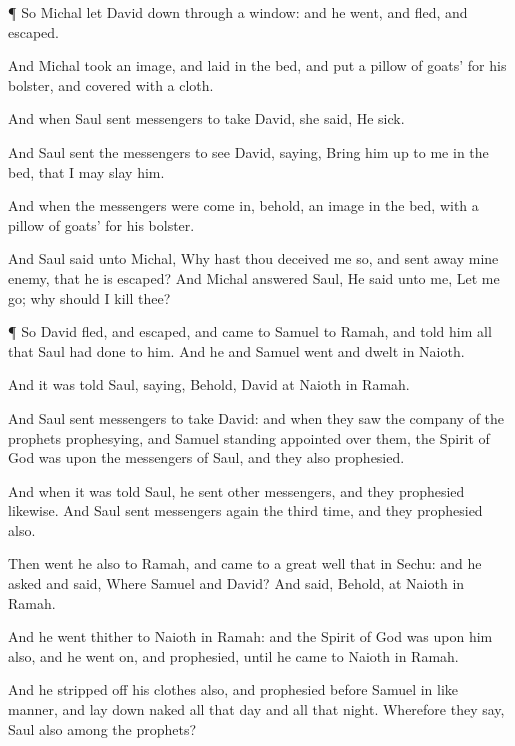 {\par }{\PP {}¶ So
Michal
let
David
down through a
window: and he
went, and
fled, and
escaped.

And
Michal
took an
image, and
laid
{} in the
bed, and
put a
pillow of
goats’
{} for his
bolster, and
covered
{} with a
cloth.

And when
Saul
sent
messengers to
take
David, she
said, He
{}
sick.

And
Saul
sent the
messengers
{} to
see
David,
saying, Bring him
up to me in the
bed, that I may
slay him.

And when the
messengers were come
in, behold,
{} an
image in the
bed, with a
pillow of
goats’
{} for his
bolster.

And
Saul
said unto
Michal, Why hast thou deceived me
so, and sent
away mine
enemy, that he is
escaped? And
Michal
answered
Saul, He
said unto me, Let me
go; why should I
kill thee?


\par }{\PP {}¶ So
David
fled, and
escaped, and
came to
Samuel to
Ramah, and
told him all that
Saul had
done to him. And he and
Samuel
went and
dwelt in
Naioth.

And it was
told
Saul,
saying, Behold,
David
{} at
Naioth in
Ramah.

And
Saul
sent
messengers to
take
David: and when they
saw the
company of the
prophets
prophesying, and
Samuel
standing
{}
appointed over them, the
Spirit of
God was upon the
messengers of
Saul, and they also
prophesied.

And when it was
told
Saul, he
sent
other
messengers, and they
prophesied likewise. And
Saul
sent
messengers
again the
third time, and they
prophesied also.

Then
went he also to
Ramah, and
came to a
great
well that
{} in
Sechu: and he
asked and
said,
Where
{}
Samuel and
David? And
{}
said, Behold,
{} at
Naioth in
Ramah.

And he
went thither to
Naioth in
Ramah: and the
Spirit of
God was upon him also, and he
went
on, and
prophesied, until he
came to
Naioth in
Ramah.

And he stripped
off his
clothes
also, and
prophesied
before
Samuel in like manner, and lay
down
naked all that
day and all that
night. Wherefore they
say,
{}
Saul also among the
prophets?




}

